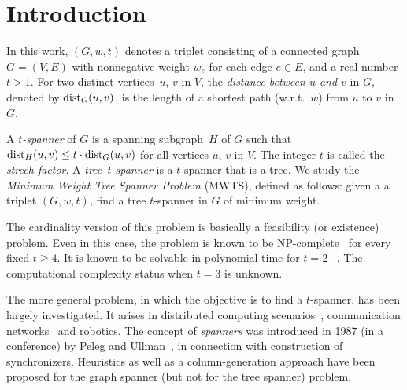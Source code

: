 \documentclass[12pt]{article}
\newcommand{\dist}{{\rm dist}}
\begin{document}
\section{Introduction}
In this work, $(G,w,t)$ denotes a triplet consisting of a connected
graph $G=(V,E)$ with nonnegative weight $w_e$ for each edge $e\in E$,
and a real number $t>1$.  For two distinct vertices~$u$, $v$ in $V$,
the \emph{distance between $u$ and $v$} in $G$, denoted by 
$\dist_{G}(u,v)$, is the length of a shortest path (w.r.t.~$w$) from
$u$ to $v$ in $G$.  

A \emph{$t$-spanner} of $G$ is a spanning subgraph~$H$ of $G$ such
that $\dist_{H}(u,v) \le t\cdot\dist_{G}(u,v)$ for all vertices $u$,
$v$ in $V$.  The integer $t$ is called the \emph{strech factor}. A
\hbox{\emph{tree $t$-spanner}} is a $t$-spanner that is a tree.  We study the
\emph{Minimum Weight Tree Spanner Problem} (MWTS), defined as
follows: given a a triplet $(G,w,t)$, find a tree $t$-spanner in $G$
of minimum weight.

The cardinality version of this problem is basically a feasibility (or
existence) problem. Even in this case, the problem is known to be
NP-complete~\cite{CaiC1995} for every fixed $t\geq 4$.  It is
known to be solvable in polynomial time for $t=2$
~\cite{Bondy1989,CaiC1995}. The computational complexity
status when $t=3$ is unknown.

The more general problem, in which the objective is to find a
$t$-spanner, has been largely investigated. It arises in distributed
computing scenarios~\cite{Awerbuch1985}, communication
networks~\cite{PelegU1988} and robotics.  The concept of
\emph{spanners} was introduced in 1987 (in a conference) by Peleg and
Ullman~\cite{PelegU1988}, in connection with construction of synchronizers.
Heuristics as well as a column-generation approach
have been proposed for the graph spanner (but not for the tree spanner) problem.


%
\end{document}
